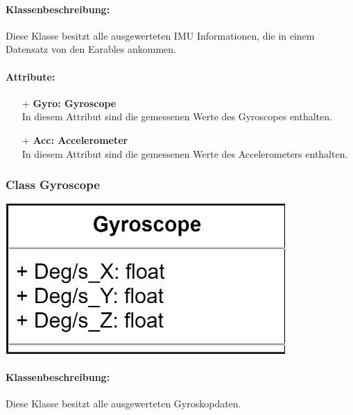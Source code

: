 \documentclass[a4paper,12pt]{article}
\begin{document}
\paragraph{Klassenbeschreibung:}
Diese Klasse besitzt alle ausgewerteten IMU Informationen, die in einem Datensatz von den \Gls{Earables} ankommen.

\paragraph{Attribute:}
\begin{itemize}
	\item[+] \textbf{Gyro: Gyroscope}\\In diesem Attribut sind die gemessenen Werte des Gyroscopes enthalten.
	\item[+] \textbf{Acc: Accelerometer}\\In diesem Attribut sind die gemessenen Werte des Accelerometers enthalten.
\end{itemize}

\begin{minipage}[b]{0.7\textwidth}
	\subsubsection{Class Gyroscope}
	
	\end{minipage}
	\begin{minipage}[c]{0.3\textwidth}
	\includegraphics[width=0.8\textwidth]{bilder/BibPackageKlassen/Gyroscope.png}
\end{minipage}
\paragraph{Klassenbeschreibung:}
Diese Klasse besitzt alle ausgewerteten Gyroskopdaten.
\end{document}
